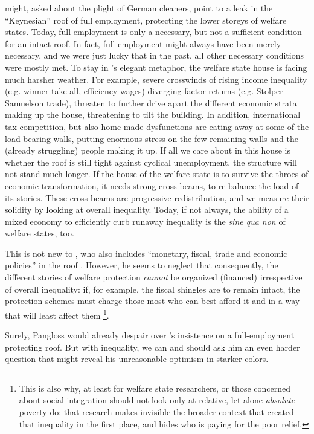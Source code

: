 \documentclass[11pt,a4paper,oneside,openright]{article}
\begin{document}
\begin{enumerate}
	\citeauthor{Offe2003} might, asked about the plight of German cleaners, point to a leak in the ``Keynesian'' roof of full employment, protecting the lower storeys of welfare states. 
	Today, full employment is only a necessary, but not a sufficient condition for an intact roof. 
	In fact, full employment might always have been merely necessary, and we were just lucky that in the past, all other necessary conditions were mostly met. 
	To stay in \citeauthor{Offe2003}'s elegant metaphor, the welfare state house is facing much harsher weather. 
	For example, severe crosswinds of rising income inequality (e.g. winner-take-all, efficiency wages) diverging factor returns (e.g. Stolper-Samuelson trade), threaten to further drive apart the different economic strata making up the house, threatening to tilt the building. 
	In addition, international tax competition, but also home-made dysfunctions are eating away at some of the load-bearing walls, putting enormous stress on the few remaining walls and the (already struggling) people making it up. 
	If all we care about in this house is whether the roof is still tight against cyclical unemployment, the structure will not stand much longer. 
	If the house of the welfare state is to survive the throes of economic transformation, it needs strong cross-beams, to re-balance the load of its stories. 
	These cross-beams are progressive redistribution, and we measure their solidity by looking at overall inequality. 
	Today, if not always, the ability of a mixed economy to efficiently curb runaway inequality is the \emph{sine qua non} of welfare states, too. 
	
	This is not new to \cite{Offe2003}, who also includes ``monetary, fiscal, trade and economic policies'' in the roof \citeyearpar[543]{Offe2003}. 
	However, he seems to neglect that consequently, the different stories of welfare protection \emph{cannot} be organized (financed) irrespective of overall inequality: 
	if, for example, the fiscal shingles are to remain intact, the protection schemes must charge those most who can best afford it and in a way that will least affect them
	\footnote{
		This is also why, at least for welfare state researchers, or those concerned about social integration should not look only at relative, let alone \emph{absolute} poverty \citep[as][1, and many others]{Grow2005} do: 
		that research makes invisible the broader context that created that inequality in the first place, and hides who is paying for the poor relief.
	}. 
	
	Surely, Pangloss would already despair over \cite{Offe2003}'s insistence on a full-employment protecting roof. 
	But with inequality, we can and should ask him an even harder question that might reveal his unreasonable optimism in starker colors.
	

\end{enumerate}
\end{document}
